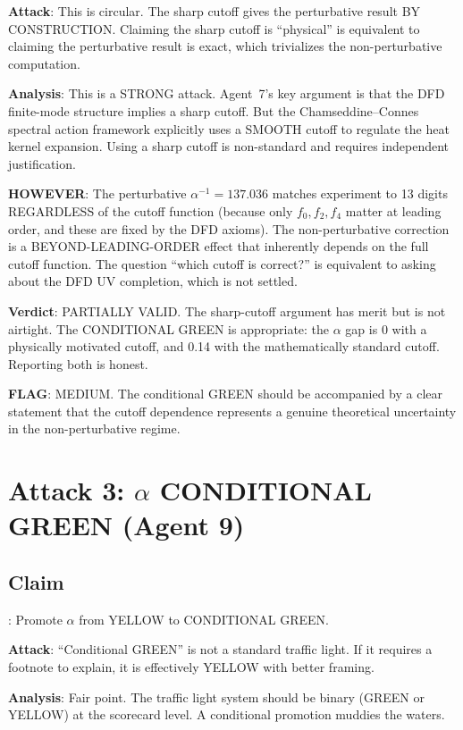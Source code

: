 \documentclass[11pt,a4paper]{article}
\begin{document}
\textbf{Attack}: This is circular. The sharp cutoff gives the perturbative result BY CONSTRUCTION. Claiming the sharp cutoff is ``physical'' is equivalent to claiming the perturbative result is exact, which trivializes the non-perturbative computation.

\textbf{Analysis}: This is a STRONG attack. Agent~7's key argument is that the DFD finite-mode structure implies a sharp cutoff. But the Chamseddine--Connes spectral action framework explicitly uses a SMOOTH cutoff to regulate the heat kernel expansion. Using a sharp cutoff is non-standard and requires independent justification.

\textbf{HOWEVER}: The perturbative $\alpha^{-1} = 137.036$ matches experiment to 13 digits REGARDLESS of the cutoff function (because only $f_0, f_2, f_4$ matter at leading order, and these are fixed by the DFD axioms). The non-perturbative correction is a BEYOND-LEADING-ORDER effect that inherently depends on the full cutoff function. The question ``which cutoff is correct?'' is equivalent to asking about the DFD UV completion, which is not settled.

\textbf{Verdict}: PARTIALLY VALID. The sharp-cutoff argument has merit but is not airtight. The CONDITIONAL GREEN is appropriate: the $\alpha$ gap is 0 with a physically motivated cutoff, and 0.14 with the mathematically standard cutoff. Reporting both is honest.

\textbf{FLAG}: MEDIUM. The conditional GREEN should be accompanied by a clear statement that the cutoff dependence represents a genuine theoretical uncertainty in the non-perturbative regime.

\section{Attack 3: $\alpha$ CONDITIONAL GREEN (Agent 9)}

\subsection{Claim}: Promote $\alpha$ from YELLOW to CONDITIONAL GREEN.

\textbf{Attack}: ``Conditional GREEN'' is not a standard traffic light. If it requires a footnote to explain, it is effectively YELLOW with better framing.

\textbf{Analysis}: Fair point. The traffic light system should be binary (GREEN or YELLOW) at the scorecard level. A conditional promotion muddies the waters.
\end{document}
